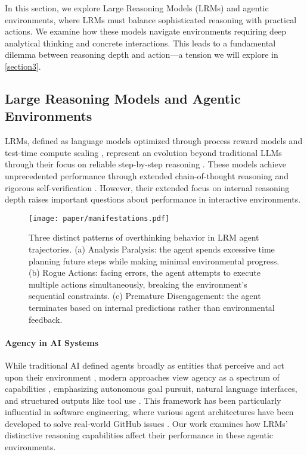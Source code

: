 In this section, we explore Large Reasoning Models (LRMs) and agentic environments,
where LRMs must balance sophisticated reasoning with practical actions. We examine how these models navigate environments requiring deep analytical thinking and concrete interactions. This leads to a fundamental dilemma between reasoning depth and action—a tension we will explore in \cref{section3}.


\subsection{Large Reasoning Models and Agentic Environments}
LRMs, defined as language models optimized through process reward models and test-time compute scaling \cite{xu2025largereasoningmodelssurvey}, represent an evolution beyond traditional LLMs through their focus on reliable step-by-step reasoning \cite{deepseekai2025deepseekr1incentivizingreasoningcapability,openai_o1}. These models achieve unprecedented performance through extended chain-of-thought reasoning \cite{wei2023chainofthoughtpromptingelicitsreasoning} and rigorous self-verification \cite{madaan2023selfrefineiterativerefinementselffeedback}. However, their extended focus on internal reasoning depth raises important questions about performance in interactive environments.

\begin{figure*}[t]
    \centering
    \texttt{[image: paper/manifestations.pdf]}
\caption{Three distinct patterns of overthinking behavior in LRM agent trajectories. (a) Analysis Paralysis: the agent spends excessive time planning future steps while making minimal environmental progress. (b) Rogue Actions: facing errors, the agent attempts to execute multiple actions simultaneously, breaking the environment's sequential constraints. (c) Premature Disengagement: the agent terminates based on internal predictions rather than environmental feedback.}
    \label{fig:manifestations}
\end{figure*}

\paragraph{Agency in AI Systems} While traditional AI defined agents broadly as entities that perceive and act upon their environment \cite{russell1995ai}, modern approaches view agency as a spectrum of capabilities \cite{zhang2024agenticinformationretrieval, kapoor2024aiagentsmatter}, emphasizing autonomous goal pursuit, natural language interfaces, and structured outputs like tool use \cite{yang2024sweagentagentcomputerinterfacesenable}. This framework has been particularly influential in software engineering, where various agent architectures \cite{ibm_swe_agents, aws_q_developer_agent, liu2024marscodeagentainativeautomated} have been developed to solve real-world GitHub issues \cite{jimenez2024swebenchlanguagemodelsresolve}. Our work examines how LRMs' distinctive reasoning capabilities affect their performance in these agentic environments.

